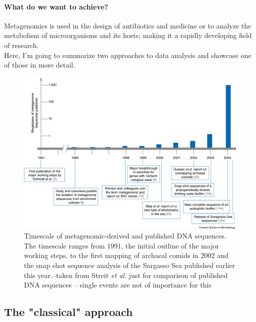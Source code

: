 \documentclass[twocolumn]{bmcart}%
\begin{document}
\paragraph*{What do we want to achieve?}
Metagenomics is used in the design of antibiotics and medicine or to analyze the metabolism of microorganisms and its hosts; making it a rapidly developing field of research.\\
Here, I'm going to summarize two approaches to data analysis and showcase one of those in more detail.
\begin{figure}
	\centering
\includegraphics[width=.9\linewidth]{bilder/growth_of_novel_gene_discovery.jpg}	
\caption{Timescale of metagenomic-derived and published DNA sequences. The timescale ranges from 1991, the initial outline of the major working steps, to the first mapping of archaeal comids in 2002 and the snap shot sequence analysis of the Sargasso Sea published earlier this year.--taken from Streit \textit{et al.} \cite{STREIT2004492} just for comparison of published DNA sequences -- single events are not of importance for this}
\label{img:nov_gene_discov}
\end{figure}
\subsection*{The "classical" approach}
\end{document}
